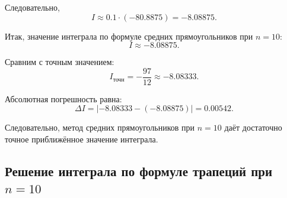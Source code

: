 \documentclass[12pt]{report}
\begin{document}
\begin{flushleft}
		Следовательно,
		\[
		I \approx 0.1 \cdot (-80.8875) = -8.08875.
		\]
		
		Итак, значение интеграла по формуле средних прямоугольников при $n=10$:
		\[
		\boxed{I\approx -8.08875.}
		\]
		
		Сравним с точным значением:
		\[
		I_{\text{точн}}=-\frac{97}{12}\approx -8.08333.
		\]
		
		Абсолютная погрешность равна:
		\[
		\Delta I = \left| -8.08333 - (-8.08875) \right| = 0.00542.
		\]
		
		Следовательно, метод средних прямоугольников при $n=10$ даёт достаточно точное приближённое значение интеграла.
	\end{flushleft}
	
	\subsection*{Решение интеграла по формуле трапеций при $n=10$}
	
\end{document}
